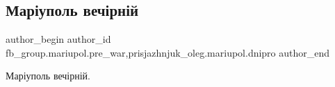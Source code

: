  
 
 
 
 

\subsection{Маріуполь вечірній}
\label{sec:09_01_2023.fb.fb_group.mariupol.pre_war.3.mar_upol_vech_rn_i}
 
\ifcmt
 author_begin
   author_id fb_group.mariupol.pre_war,prisjazhnjuk_oleg.mariupol.dnipro
 author_end
\fi

Маріуполь вечірній.

